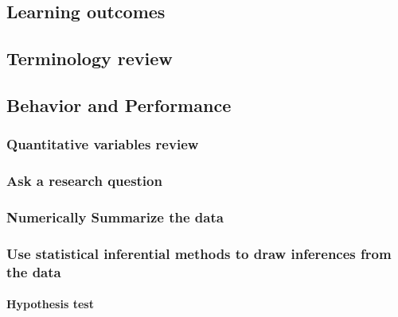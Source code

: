 \documentclass[
]{report}
\begin{document}
\subsection{Learning outcomes}\label{learning-outcomes-27}

\subsection{Terminology review}\label{terminology-review-21}

\subsection{Behavior and Performance}\label{behavior-and-performance}

\subsubsection*{Quantitative variables review}\label{quantitative-variables-review}

\subsubsection*{Ask a research question}\label{ask-a-research-question-6}

\subsubsection*{Numerically Summarize the data}\label{numerically-summarize-the-data}

\subsubsection*{Use statistical inferential methods to draw inferences from the data}\label{use-statistical-inferential-methods-to-draw-inferences-from-the-data-5}

\paragraph*{Hypothesis test}\label{hypothesis-test-5}
\end{document}
